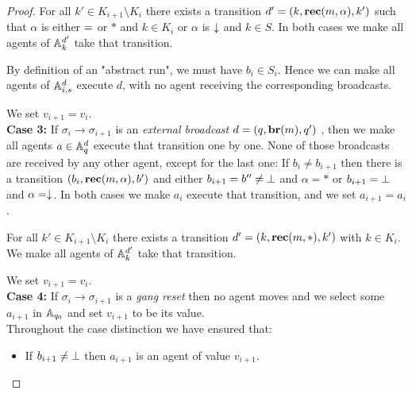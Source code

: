 \begin{proof}
	For all $k' \in K_{i+1} \setminus K_i $ there exists a transition $d'=(k, \textbf{rec}(m, \alpha), k')$ such that $\alpha$ is either ${=}$ or $*$ and $k \in K_i$ or $\alpha$ is $\downarrow$ and $k\in S$.
	In both cases we make all agents of $\mathbb{A}_k^{d'}$ take that transition.
	
	By definition of an "abstract run", we must have $b_i \in S_i$.
	Hence we can make all agents of $\mathbb{A}_{i,s}^{d}$ execute $d$, with no agent receiving the corresponding broadcasts.
	
	We set $v_{i+1} = v_i$.
	\\
	
	\textbf{Case 3: } If $\sigma_i \to \sigma_{i+1}$ is an \emph{external broadcast} $d = (q, \textbf{br}(m), q')$ , then we make all agents $a \in \mathbb{A}_q^{d}$ execute that transition one by one. None of those broadcasts are received by any other agent, except for the last one:
	If $b_i \neq b_{i+1}$ then there is a transition $(b_i, \textbf{rec}(m, \alpha), b')$ and either $b_{i+1} = b'' \neq \bot$ and $\alpha = *$ or $b_{i+1} = \bot$ and $\alpha=\downarrow$. In both cases we make $a_i$ execute that transition, and we set $a_{i+1} = a_i$.
	
	For all $k' \in K_{i+1} \setminus K_i$ there exists a transition $d'=(k, \textbf{rec}(m, *), k')$ with $k \in K_i$. We make all agents of $\mathbb{A}_k^{d'}$ take that transition.
	
	We set $v_{i+1} = v_i$.
	\\
	
	\textbf{Case 4: }  If $\sigma_i \to \sigma_{i+1}$ is a \emph{gang reset} then no agent moves and we select some $a_{i+1}$ in $\mathbb{A}_{q_0}$ and set $v_{i+1}$ to be its value.
	\\
	
	Throughout the case distinction we have ensured that:
	\begin{itemize}
		\item If $b_{i+1} \neq \bot$ then $a_{i+1}$ is an agent of value $v_{i+1}$.
		

\end{itemize}
\end{proof}
